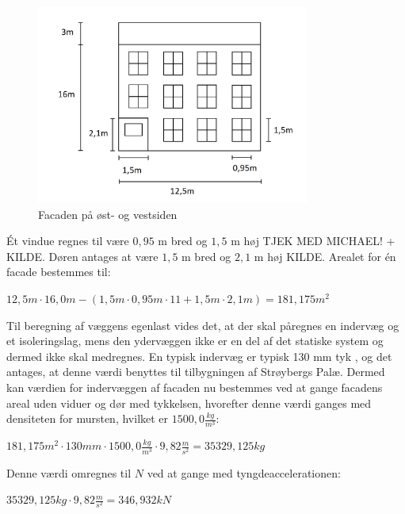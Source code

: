 \begin{figure}[htbp]
	\centering
	\includegraphics[width=0.8\textwidth]{billeder/facadenord.png}
	\caption{Facaden på øst- og vestsiden}
	\label{fig:facade}
\end{figure}

\indent{     }  Ét vindue regnes til være $0,\!95$ m bred og $1,\!5$ m høj TJEK MED MICHAEL! + KILDE. Døren antages at være $1,\!5$ m bred og $2,\!1$ m høj KILDE. Arealet for én facade bestemmes til:
\begin{center}
	$12,\!5 m\cdot 16,\!0 m - (1,\!5 m\cdot0,\!95 m\cdot11 + 1,\!5 m\cdot 2,\!1 m)=181,\!175 m^2$
\end{center}

Til beregning af væggens egenlast vides det, at der skal påregnes en indervæg og et isoleringslag, mens den ydervæggen ikke er en del af det statiske system og dermed ikke skal medregnes.
\newline \indent{     }  En typisk indervæg er typisk 130 mm tyk \citep{indervaeg}, og det antages, at denne værdi benyttes til tilbygningen af Strøybergs Palæ. Dermed kan værdien for indervæggen af facaden nu bestemmes ved at gange facadens areal uden viduer og dør med tykkelsen, hvorefter denne værdi ganges med densiteten for mursten, hvilket er $1500,\!0 \frac{kg}{m^3}$:
\begin{center}
	$181,\!175 m^2\cdot 130 mm\cdot 1500,\!0 \frac{kg}{m^3}\cdot 9,\!82 \frac{m}{s^2}=35329,\!125 kg$
\end{center}

Denne værdi omregnes til $N$ ved at gange med tyngdeaccelerationen:
\begin{center}
	$35329,\!125 kg\cdot 9,\!82 \frac{m}{s^2}=346,\!932 kN$
\end{center}

